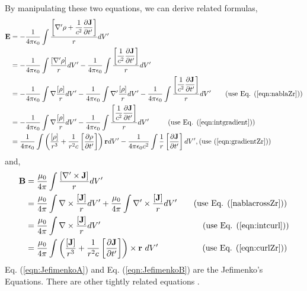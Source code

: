 \documentclass[11pt]{article}              %
\begin{document}
By manipulating these two equations, we can derive related formulas,
\begin{align}
    {\mathbf E}&=-\frac{1}{4\pi\epsilon_0}\int\frac{\left[\nabla^\prime\rho+\dfrac{1}{c^2}\dfrac{\partial {\mathbf J}}{\partial t^\prime}\right]}{r}dV^\prime\notag\\%
    &=-\frac{1}{4\pi\epsilon_0}\int\frac{\left[\nabla^\prime\rho\right]}{r}dV^\prime
    -\frac{1}{4\pi\epsilon_0}\int\frac{\left[\dfrac{1}{c^2}\dfrac{\partial {\mathbf J}}{\partial t^\prime}\right]}{r}dV^\prime\notag\\
    &=-\frac{1}{4\pi\epsilon_0}\int\nabla\frac{\left[\rho\right]}{r}dV^\prime-\frac{1}{4\pi\epsilon_0}\int\nabla^\prime\frac{\left[\rho\right]}{r}dV^\prime-\frac{1}{4\pi\epsilon_0}\int\frac{\left[\dfrac{1}{c^2}\dfrac{\partial {\mathbf J}}{\partial t^\prime}\right]}{r}dV^\prime\tag{use Eq. (\ref{eqn:nablaZr})}\\
    &=-\frac{1}{4\pi\epsilon_0}\int\nabla\frac{\left[\rho\right]}{r}dV^\prime
    -\frac{1}{4\pi\epsilon_0}\int\frac{\left[\dfrac{1}{c^2}\dfrac{\partial {\mathbf J}}{\partial t^\prime}\right]}{r}dV^\prime\ \ \ \ \ \ \ \ \mbox{(use Eq. (\ref{eqn:intgradient})})\label{eqn:Epotentialpre}\\
    &=\frac{1}{4\pi\epsilon_0}\int\left(\frac{[\rho]}{r^3}+\frac{1}{r^2 c}\left[\frac{\partial \rho}{\partial t^\prime}\right]\right){\mathbf r}d V^\prime-\frac{1}{4\pi\epsilon_0 c^2}\int\frac{1}{r}\left[\dfrac{\partial {\mathbf J}}{\partial t^\prime}\right]dV^\prime,
    \mbox{(use (\ref{eqn:gradientZr}))}\label{eqn:JefimenkoA}
\end{align}
and,
\begin{align}
    {\mathbf B}&=\frac{\mu_0}{4\pi}\int\frac{[\nabla^\prime\times{\mathbf J}]}{r}dV^\prime\notag\\
    &=\frac{\mu_0}{4\pi}\int\nabla\times\frac{[{\mathbf J}]}{r}dV^\prime+\frac{\mu_0}{4\pi}\int\nabla^\prime\times\frac{[{\mathbf J}]}{r}dV^\prime\tag{use Eq. (\ref{nablacrossZr})}\\
    &=\frac{\mu_0}{4\pi}\int\nabla\times\frac{[{\mathbf J}]}{r}dV^\prime\ \ \ \ \ \ \ \ \ \ \ \ \ \ \ \ \ \ \ \ \ \ \ \ \ \ \ \ \ \ \ \ \ \ \ \ \ \mbox{(use Eq. (\ref{eqn:intcurl}))}\label{eqn:Bpotentialpre}\\
    &=\frac{\mu_0}{4\pi}\int\left(\frac{[\mathbf J]}{r^3}+\frac{1}{r^2c}\left[\frac{\partial{\mathbf J}}{\partial t^\prime}\right]\right)\times{\mathbf r}\ dV^\prime\ \ \ \ \ \ \ \ \ \ \ \ \ \ \ \ \mbox{(use Eq. (\ref{eqn:curlZr}))}\label{eqn:JefimenkoB}
\end{align}
Eq. (\ref{eqn:JefimenkoA}) and Eq. (\ref{eqn:JefimenkoB}) are the Jefimenko's Equations. There are other tightly related equations \cite{panofsky1962classical} \cite{mcdonald1997relation}.
\end{document}
